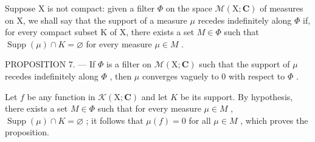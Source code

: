 Suppose X is not compact: given a filter \(\Phi\) on the space \(\mathcal{M}(\mathrm{X};\mathbf{C})\) of measures on X, we shall say that the support of a measure \(\mu\) recedes indefinitely along \(\Phi\) if, for every compact subset K of X, there exists a set \(M\in\Phi\) such that \(\operatorname{Supp}(\mu)\cap K=\varnothing\) for every measure \(\mu\in M\) .

PROPOSITION 7. --- If \(\Phi\) is a filter on \(\mathcal{M}(\mathrm{X};\mathbf{C})\) such that the support of \(\mu\) recedes indefinitely along \(\Phi\) , then \(\mu\) converges vaguely to 0 with respect to \(\Phi\) .

Let \(f\) be any function in \(\mathcal{K}(\mathrm{X};\mathbf{C})\) and let \(K\) be its support. By hypothesis, there exists a set \(M \in \Phi\) such that for every measure \(\mu \in M\) , \(\operatorname{Supp}(\mu) \cap K = \varnothing\) ; it follows that \(\mu(f) = 0\) for all \(\mu \in M\) , which proves the proposition.

